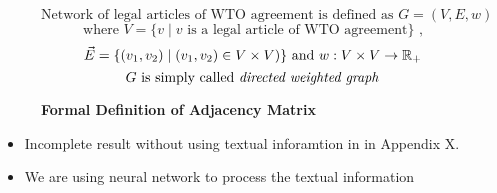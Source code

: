 \documentclass[12pt,letterpaper]{article}
\begin{document}
\begin{figure}[ht]
  \[\text{Network of legal articles of WTO agreement is defined as }  G = (V, E, w) \] 
  \[\text{ where } V = \{v \mid v\text{ is a legal article of WTO agreement}\}  \text{ , } \]
  \[\vec{E} = \{(v_1, v_2) \mid (v_1, v_2)\in V \times V)\} \text{ and }w : V \times V \to \Bbb R_{+} \]
  \[G\text{ is simply called \textit{directed weighted graph}}\]
  \caption{\textbf{Formal Definition of Adjacency Matrix}}
  \label{fig:adj}
  \end{figure}

\begin{itemize}
  \item Incomplete result without using textual inforamtion in in Appendix X.
  \item We are using neural network to process the textual information
\end{itemize}



% 

% 

% 



\end{document}
